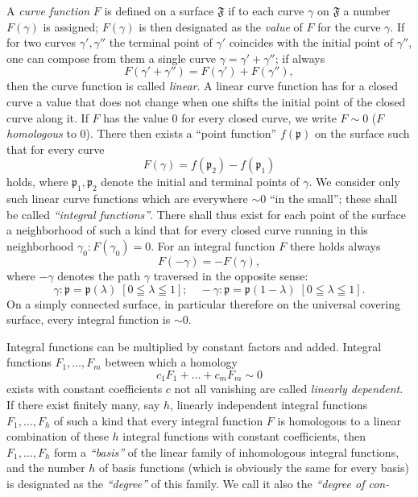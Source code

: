 \documentclass{article}
\begin{document}
A \emph{curve function} $F$ is defined on a surface $\mathfrak{F}$ if to each curve $\gamma$ on $\mathfrak{F}$ a number $F(\gamma)$ is assigned; $F(\gamma)$ is then designated as the \emph{value} of $F$ for the curve $\gamma$. If for two curves $\gamma', \gamma''$ the terminal point of $\gamma'$ coincides with the initial point of $\gamma''$, one can compose from them a single curve $\gamma = \gamma' + \gamma''$; if always
\[ F(\gamma' + \gamma'') = F(\gamma') + F(\gamma''), \]
then the curve function is called \emph{linear}. A linear curve function has for a closed curve a value that does not change when one shifts the initial point of the closed curve along it. If $F$ has the value $0$ for every closed curve, we write $F \sim 0$ ($F$ \emph{homologous} to $0$). There then exists a ``point function'' $f(\mathfrak{p})$ on the surface such that for every curve
\[ F(\gamma) = f(\mathfrak{p}_2) - f(\mathfrak{p}_1) \]
holds, where $\mathfrak{p}_1, \mathfrak{p}_2$ denote the initial and terminal points of $\gamma$. We consider only such linear curve functions which are everywhere $\sim 0$ ``in the small''; these shall be called \emph{``integral functions''}. There shall thus exist for each point of the surface a neighborhood of such a kind that for every closed curve running in this neighborhood $\gamma_0\colon F(\gamma_0) = 0$. For an integral function $F$ there holds always
\[ F(-\gamma) = - F(\gamma), \]
where $-\gamma$ denotes the path $\gamma$ traversed in the opposite sense:
\[ \gamma\colon \mathfrak{p} = \mathfrak{p}(\lambda) \; [0 \leqq \lambda \leqq 1]; \quad -\gamma\colon \mathfrak{p} = \mathfrak{p}(1 - \lambda) \; [0 \leqq \lambda \leqq 1]. \]
On a simply connected surface, in particular therefore on the universal covering surface, every integral function is $\sim 0$.

Integral functions can be multiplied by constant factors and added. Integral functions $F_1, \dots, F_m$ between which a homology
\[ c_1 F_1 + \dots + c_m F_m \sim 0 \]
exists with constant coefficients $c$ not all vanishing are called \emph{linearly dependent}. If there exist finitely many, say $h$, linearly independent integral functions $F_1, \dots, F_h$ of such a kind that every integral function $F$ is homologous to a linear combination of these $h$ integral functions with constant coefficients, then $F_1, \dots, F_h$ form a \emph{``basis''} of the linear family of inhomologous integral functions, and the number $h$ of basis functions (which is obviously the same for every basis) is designated as the \emph{``degree''} of this family. We call it also the \emph{``degree of con-}
\end{document}
